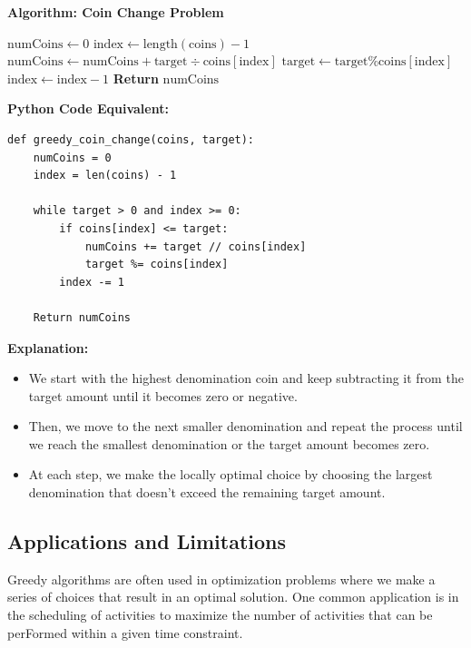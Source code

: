 \documentclass[12pt]{book} %
\begin{document}
\textbf{Algorithm: Coin Change Problem}
\FloatBarrier
\begin{algorithm}
\caption{Greedy Coin Change Algorithm}
\begin{algorithmic}[1]
    \State $\text{numCoins} \gets 0$
    \State $\text{index} \gets \text{length}(\text{coins}) - 1$
            \State $\text{numCoins} \gets \text{numCoins} + \text{target} \div \text{coins}[\text{index}]$
            \State $\text{target} \gets \text{target} \% \text{coins}[\text{index}]$
        \EndIf
        \State $\text{index} \gets \text{index} - 1$
    \EndWhile
    \State \textbf{Return} $\text{numCoins}$
\EndProcedure
\end{algorithmic}
\end{algorithm}
\FloatBarrier
\textbf{Python Code Equivalent:}
\FloatBarrier
\begin{lstlisting}
def greedy_coin_change(coins, target):
    numCoins = 0
    index = len(coins) - 1
    
    while target > 0 and index >= 0:
        if coins[index] <= target:
            numCoins += target // coins[index]
            target %= coins[index]
        index -= 1
        
    Return numCoins

\end{lstlisting}
\FloatBarrier
\textbf{Explanation:}
\begin{itemize}
    \item We start with the highest denomination coin and keep subtracting it from the target amount until it becomes zero or negative.
    \item Then, we move to the next smaller denomination and repeat the process until we reach the smallest denomination or the target amount becomes zero.
    \item At each step, we make the locally optimal choice by choosing the largest denomination that doesn't exceed the remaining target amount.
\end{itemize}

\subsection{Applications and Limitations}
Greedy algorithms are often used in optimization problems where we make a series of choices that result in an optimal solution. One common application is in the scheduling of activities to maximize the number of activities that can be perFormed within a given time constraint.
\end{document}
